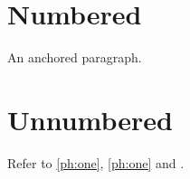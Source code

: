 \documentclass{article}
\begin{document}
\section{Numbered}
\label{ph:one}
An anchored paragraph.
\section*{Unnumbered}\label{sec:star}
Refer to \ref{ph:one}, \autoref{ph:one} and .
\end{document}
